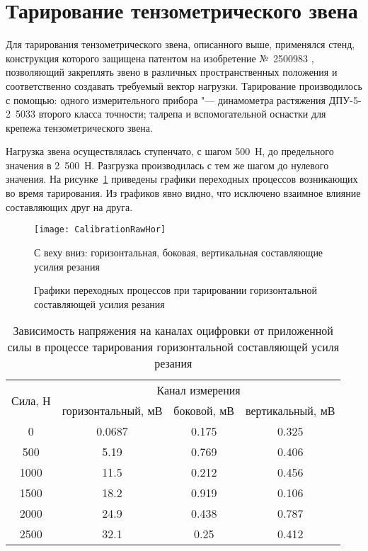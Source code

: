 	\section{Тарирование тензометрического звена}
	
	Для тарирования тензометрического звена, описанного выше, применялся стенд, конструкция которого защищена патентом на изобретение №~2500983 \cite{CalibrationStend}, позволяющий закреплять звено в различных пространственных положения и соответственно создавать требуемый вектор нагрузки. Тарирование производилось с помощью: одного измерительного прибора "--- динамометра растяжения ДПУ-5-2~5033 второго класса точности; талрепа и вспомогательной оснастки для крепежа тензометрического звена.
	
	Нагрузка звена осуществлялась ступенчато, с шагом 500~Н, до предельного значения в 2~500~Н. Разгрузка производилась с тем же шагом до нулевого значения. На рисунке~\ref{fig:CalibrationRawHor} приведены графики переходных процессов возникающих во время тарирования. Из графиков явно видно, что исключено взаимное влияние составляющих друг на друга.
	
	\begin{figure} [ht]
		\centering
		\texttt{[image: CalibrationRawHor]}
		
		С веху вниз: горизонтальная, боковая, вертикальная составляющие усилия резания
		\caption{Графики переходных процессов при тарировании горизонтальной составляющей усилия резания}  
		\label{fig:CalibrationRawHor}  
	\end{figure}
	
	\begin{table}[htp]
		\centering
		\caption{Зависимость напряжения на каналах оцифровки от приложенной силы в процессе тарирования горизонтальной составляющей усиля резания}
		\label{tab:DCHor}
		\begin{tabular}{|c|c|c|c|}
			\hline
			\multirow{2}{*}{{Сила, Н}} & \multicolumn{3}{c|}{Канал измерения} \tabularnewline
			\cline{2-4}
			                           & {горизонтальный, мВ}                                 & {боковой, мВ} & {вертикальный, мВ}\tabularnewline
			\hline
			\hline
			0                          & 0.0687                                               & 0.175         & 0.325\tabularnewline
			500                        & 5.19                                                 & 0.769         & 0.406\tabularnewline
			1000                       & 11.5                                                 & 0.212         & 0.456\tabularnewline
			1500                       & 18.2                                                 & 0.919         & 0.106\tabularnewline
			2000                       & 24.9                                                 & 0.438         & 0.787\tabularnewline
			2500                       & 32.1                                                 & 0.25          & 0.412\tabularnewline
			\hline
		\end{tabular}
	\end{table}


